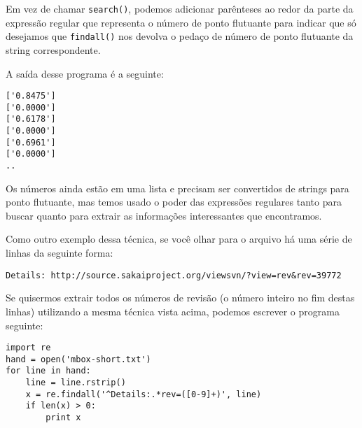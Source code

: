 Em vez de chamar {\tt search()}, podemos adicionar parênteses ao redor da
parte da expressão regular que representa o número de ponto flutuante para
indicar que só desejamos que {\tt findall()} nos devolva o pedaço de número
de ponto flutuante da string correspondente.

A saída desse programa é a seguinte:

\beforeverb
\begin{verbatim}
['0.8475']
['0.0000']
['0.6178']
['0.0000']
['0.6961']
['0.0000']
..
\end{verbatim}
\afterverb
%

Os números ainda estão em uma lista e precisam ser convertidos de strings
para ponto flutuante, mas temos usado o poder das expressões regulares tanto
para buscar quanto para extrair as informações interessantes que encontramos.

Como outro exemplo dessa técnica, se você olhar para o arquivo há uma série de
linhas da seguinte forma:

\beforeverb
\begin{verbatim}
Details: http://source.sakaiproject.org/viewsvn/?view=rev&rev=39772
\end{verbatim}
\afterverb
%

Se quisermos extrair todos os números de revisão (o número inteiro no fim
destas linhas) utilizando a mesma técnica vista acima, podemos escrever o
programa seguinte:

\beforeverb
\begin{verbatim}
import re
hand = open('mbox-short.txt')
for line in hand:
    line = line.rstrip()
    x = re.findall('^Details:.*rev=([0-9]+)', line)
    if len(x) > 0:
        print x
\end{verbatim}
\afterverb
%

